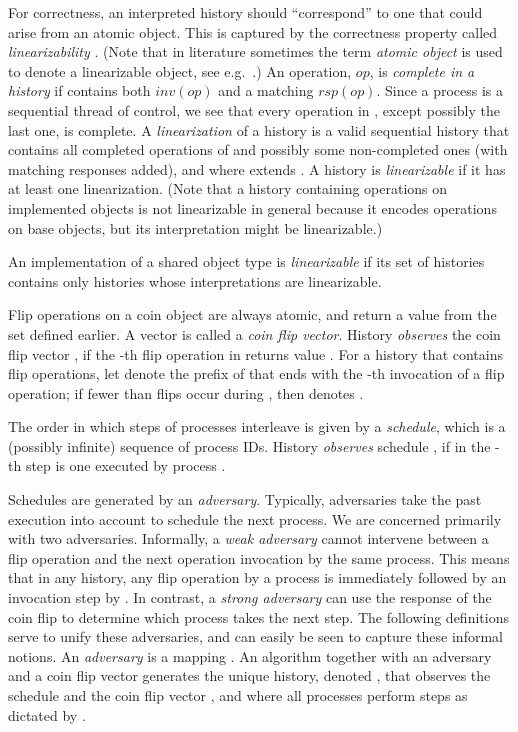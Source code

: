 \documentclass[11pt,letterpaper]{article}
\newcommand{\op}{\ensuremath{\mathit{op}}}
\newcommand{\inv}[1]{\ensuremath{inv(#1)}}
\newcommand{\rsp}[1]{\ensuremath{rsp(#1)}}
\begin{document}
For correctness, an interpreted history should ``correspond'' to one that could arise from an atomic object.
This is captured by the correctness property called \emph{linearizability} \cite{her:lin}.
(Note that in literature sometimes the term \emph{atomic object} is used to denote a linearizable object, see e.g.\ \cite{Lynch_DistributedAlgorithms1996}.)
An operation, \op, is \emph{complete in a history } if  contains both \inv{\op} and a matching \rsp{\op}.
Since a process is a sequential thread of control,
we see that every operation in , except possibly the last one, is complete.
A \emph{linearization} of a history  is a valid sequential history 
that contains all completed operations of  and possibly some non-completed ones (with matching responses added),
and where  extends .
A history  is \emph{linearizable} if it has at least one linearization.
(Note that a history containing operations on implemented objects is not linearizable in general because it encodes operations
  on base objects, but its interpretation might be linearizable.)

An implementation of a shared object type is \emph{linearizable} if its set of histories
contains only histories whose interpretations are linearizable.

Flip operations on a coin object are always atomic,
and return a value from the set  defined earlier.
A vector  is called a \emph{coin flip vector}.
History  \emph{observes} the coin flip vector ,
if the -th flip operation in  returns value .
For a history  that contains  flip operations,
let  denote the prefix of  that ends with the -th invocation of a flip operation; if fewer than  flips occur during , then  denotes .

The order in which steps of processes interleave is given by a
\emph{schedule}, which is a (possibly infinite) sequence of process IDs.
History  \emph{observes} schedule ,
if in  the -th step is one executed by process .

Schedules are generated by an \emph{adversary}.
Typically, adversaries take the past execution into account to schedule the next process.
We are concerned primarily with two adversaries.
Informally, a \emph{weak adversary} cannot intervene between a flip operation and the next operation invocation by the same process.
This means that in any history, any flip operation by a process  is immediately followed by an invocation step by .
In contrast, a \emph{strong adversary} can use the response of the coin flip to determine which process takes the next step.
The following definitions serve to unify these adversaries, and can easily be seen to capture these informal notions.
An \emph{adversary} is a mapping .
An algorithm  together with an adversary  and a coin flip vector 
generates the unique history, denoted ,
that observes the schedule  and the coin flip vector ,
and where  all processes perform steps as dictated by .
\end{document}
